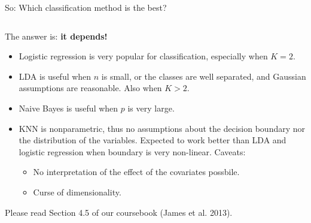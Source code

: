 \documentclass[10pt,ignorenonframetext,]{beamer}
\providecommand{\tightlist}{%
  \setlength{\itemsep}{0pt}\setlength{\parskip}{0pt}}
\begin{document}
\begin{frame}

\begin{block}{So: Which classification method is the best?}

\(~\)

The answer is: \textbf{it depends!}

\vspace{2mm}

\begin{itemize}
\tightlist
\item
  Logistic regression is very popular for classification, especially
  when \(K = 2\).
\end{itemize}

\vspace{2mm}

\begin{itemize}
\tightlist
\item
  LDA is useful when \(n\) is small, or the classes are well separated,
  and Gaussian assumptions are reasonable. Also when \(K > 2\).
\end{itemize}

\vspace{2mm}

\begin{itemize}
\tightlist
\item
  Naive Bayes is useful when \(p\) is very large.
\end{itemize}

\vspace{2mm}

\begin{itemize}
\tightlist
\item
  KNN is nonparametric, thus no assumptions about the decision boundary
  nor the distribution of the variables. Expected to work better than
  LDA and logistic regression when boundary is very non-linear. Caveats:

  \begin{itemize}
  \tightlist
  \item
    No interpretation of the effect of the covariates possbile.
  \item
    Curse of dimensionality.
  \end{itemize}
\end{itemize}

\vspace{2mm}

Please read Section 4.5 of our coursebook (James et al. 2013).

\end{block}

\end{frame}
\end{document}
